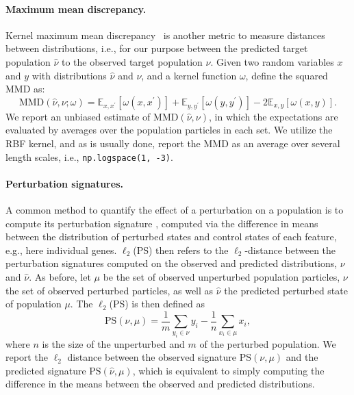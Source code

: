 \paragraph{Maximum mean discrepancy.}
Kernel maximum mean discrepancy~\citep{gretton2012kernel} is another metric to measure distances between distributions, i.e., for our purpose between the predicted target population $\hat{\nu}$ to the observed target population $\nu$.
Given two random variables $x$ and $y$ with distributions $\hat{\nu}$ and $\nu$, and a kernel function $\omega$, \citet{gretton2012kernel} define the squared MMD as:
\begin{equation*}
    \text{MMD}(\hat{\nu},\nu; \omega) = \mathbb{E}_{x,x^\prime}[\omega(x, x^\prime)] + \mathbb{E}_{y,y^\prime}[\omega(y, y^\prime)] - 2\mathbb{E}_{x,y}[\omega(x, y)].
\end{equation*}
We report an unbiased estimate of $\text{MMD}(\hat{\nu},\nu)$, in which the expectations are evaluated by averages over the population particles in each set. We utilize the RBF kernel, and as is usually done, report the MMD as an average over several length scales, i.e., \texttt{np.logspace(1, -3)}.

\paragraph{Perturbation signatures.}
A common method to quantify the effect of a perturbation on a population is to compute its perturbation signature \citep[(PS)]{stathias2018drug}, computed via the difference in means between the distribution of perturbed states and control states of each feature, e.g., here individual genes. $\ell_2$(PS) then refers to the $\ell_2$-distance between the perturbation signatures computed on the observed and predicted distributions, $\nu$ and $\hat{\nu}$. As before, let $\mu$ be the set of observed unperturbed population particles, $\nu$ the set of observed perturbed particles, as well as $\hat{\nu}$ the predicted perturbed state of population $\mu$. The $\ell_2$(PS) is then defined as
\begin{equation*}
    \text{PS}(\nu, \mu) = \frac{1}{m}\sum_{y_i \in \nu}{y_i} - \frac{1}{n}\sum_{x_i \in \mu}{x_i},
\end{equation*}
where $n$ is the size of the unperturbed and $m$ of the perturbed population.
We report the $\ell_2$ distance between the observed signature $\text{PS}(\nu, \mu)$ and the predicted signature $\text{PS}(\hat{\nu}, \mu)$, which is equivalent to simply computing the difference in the means between the observed and predicted distributions.


